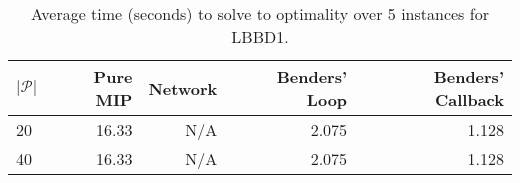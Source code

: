 \begin{table*}
    \centering
    \caption{Average time (seconds) to solve to optimality over 5 instances for LBBD1.}
    \begin{tabular}{lrrrr} \toprule
        $|\mathcal{P}|$ & Pure MIP & Network & Benders' Loop & Benders' Callback \\\midrule
        20              & 16.33    & N/A     &   2.075       & 1.128 \\
        40              & 16.33    & N/A     &   2.075       & 1.128 \\
        \bottomrule
    \end{tabular}
\end{table*}

